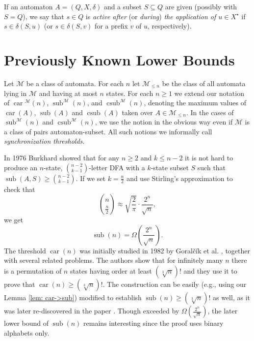 \documentclass{ws-ijmpc}
\DeclareMathOperator{\car}{car}
\DeclareMathOperator{\sub}{sub}
\DeclareMathOperator{\csub}{csub}
\begin{document}
If an automaton $A=\left(Q,X,\delta\right)$ and a subset $S\subseteq Q$
are given (possibly with $S=Q$), we say that $s\in Q$ is \emph{active
after }(or \emph{during}) \emph{the application of $u\in X^{\star}$
}if $s\in\delta\!\left(S,u\right)$ (or $s\in\delta\!\left(S,v\right)$
for a prefix $v$ of $u$, respectively).


\section{Previously Known Lower Bounds\label{sec:Previously-Known-Lower}}

Let $\mathcal{M}$ be a class of automata. For each $n$ let $\mathcal{M}_{\leq n}$
be the class of all automata lying in $\mathcal{M}$ and having at
most $n$ states. For each $n\ge1$ we extend our notation of $\car{}^{\mathcal{M}}\!\left(n\right)$,
$\sub^{\mathcal{M}}\!\left(n\right)$, and $\csub^{\mathcal{M}}\!\left(n\right)$,
denoting the maximum values of $\car\!\left(A\right)$, $\sub\!\left(A\right)$
and $\csub\!\left(A\right)$ taken over $A\in\mathcal{M}_{\le n}$.
In the cases of $\sub^{\mathcal{M}}\!\left(n\right)$ and $\csub^{\mathcal{M}}\!\left(n\right)$,
we use the notion in the obvious way even if $\mathcal{M}$ is a class
of pairs automaton-subset. All such notions we informally call \emph{synchronization
thresholds.} 

In 1976 Burkhard \citep{BUR1} showed that for any $n\ge2$ and $k\le n-2$
it is not hard to produce an $n$-state, $\binom{n-2}{k-1}$-letter
DFA with a $k$-state subset $S$ such that $\sub\!\left(A,S\right)\ge{n-2 \choose k-1}$.
If we set $k=\frac{n}{2}$ and use Stirling's approximation to check
that
\[
\binom{n}{\frac{n}{2}}\approx\sqrt{\frac{2}{\pi}}\cdot\frac{2^{n}}{\sqrt{n}},
\]
we get
\[
\sub\!\left(n\right)=\Omega\!\left(\frac{2^{n}}{\sqrt{n}}\right).
\]
The threshold $\car\!\left(n\right)$ was initially studied in 1982
by Goral\v{c}\'{i}k et al. \citep{GK1}, together with several related
problems. The authors show that for infinitely many $n$ there is
a permutation of $n$ states having order at least $\left(\sqrt[3]{n}\right)!$
and they use it to prove that $\car\!\left(n\right)\geq\left(\sqrt[3]{n}\right)!$.
The construction can be easily (e.g., using our Lemma \ref{lem: car->sub})
modified to establish $\sub\!\left(n\right)\geq\left(\sqrt[3]{n}\right)!$
as well, as it was later re-discovered in the paper \citep{LY1}.
Though exceeded by $\Omega\!\left(\frac{2^{n}}{\sqrt{n}}\right)$,
the later lower bound of $\sub\!\left(n\right)$ remains interesting
since the proof uses binary alphabets only.
\end{document}
